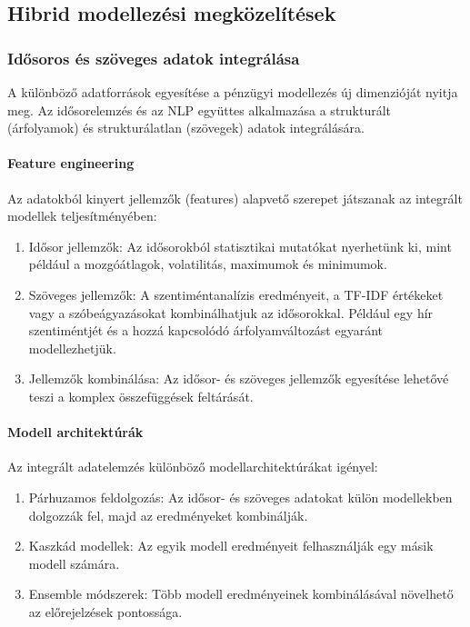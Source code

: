 \documentclass[11pt]{article}
\begin{document}
    \subsection{Hibrid modellezési
megközelítések}\label{hibrid-modellezuxe9si-megkuxf6zeluxedtuxe9sek}

\subsubsection{Idősoros és szöveges adatok
integrálása}\label{idux151soros-uxe9s-szuxf6veges-adatok-integruxe1luxe1sa}

A különböző adatforrások egyesítése a pénzügyi modellezés új dimenzióját
nyitja meg. Az idősorelemzés és az NLP együttes alkalmazása a
strukturált (árfolyamok) és strukturálatlan (szövegek) adatok
integrálására.

\paragraph{Feature engineering}\label{feature-engineering}

Az adatokból kinyert jellemzők (features) alapvető szerepet játszanak az
integrált modellek teljesítményében:

\begin{enumerate}
\def\labelenumi{\arabic{enumi}.}
\item
  Idősor jellemzők: Az idősorokból statisztikai mutatókat nyerhetünk ki,
  mint például a mozgóátlagok, volatilitás, maximumok és minimumok.
\item
  Szöveges jellemzők: A szentiméntanalízis eredményeit, a TF-IDF
  értékeket vagy a szóbeágyazásokat kombinálhatjuk az idősorokkal.
  Például egy hír szentiméntjét és a hozzá kapcsolódó árfolyamváltozást
  egyaránt modellezhetjük.
\item
  Jellemzők kombinálása: Az idősor- és szöveges jellemzők egyesítése
  lehetővé teszi a komplex összefüggések feltárását.
\end{enumerate}

\paragraph{Modell architektúrák}\label{modell-architektuxfaruxe1k}

Az integrált adatelemzés különböző modellarchitektúrákat igényel:

\begin{enumerate}
\def\labelenumi{\arabic{enumi}.}
\item
  Párhuzamos feldolgozás: Az idősor- és szöveges adatokat külön
  modellekben dolgozzák fel, majd az eredményeket kombinálják.
\item
  Kaszkád modellek: Az egyik modell eredményeit felhasználják egy másik
  modell számára.
\item
  Ensemble módszerek: Több modell eredményeinek kombinálásával növelhető
  az előrejelzések pontossága.
\end{enumerate}
\end{document}
